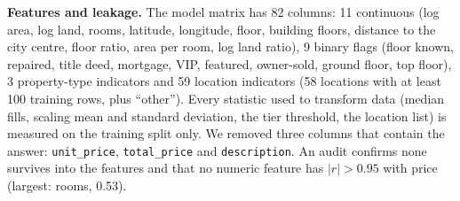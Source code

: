 \textbf{Features and leakage.} The model matrix has 82 columns: 11 continuous (log area, log land, rooms, latitude, longitude, floor, building floors, distance to the city centre, floor ratio, area per room, log land ratio), 9 binary flags (floor known, repaired, title deed, mortgage, VIP, featured, owner-sold, ground floor, top floor), 3 property-type indicators and 59 location indicators (58 locations with at least 100 training rows, plus ``other''). Every statistic used to transform data (median fills, scaling mean and standard deviation, the tier threshold, the location list) is measured on the training split only. We removed three columns that contain the answer: \texttt{unit\_price}, \texttt{total\_price} and \texttt{description}. An audit confirms none survives into the features and that no numeric feature has $|r|>0.95$ with price (largest: rooms, 0.53).
